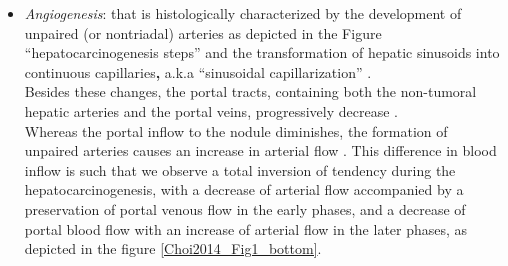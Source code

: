 \documentclass[]{article}
\begin{document}
\begin{itemize}
\item \emph{Angiogenesis}: that is histologically characterized by the
  development of unpaired (or nontriadal) arteries as depicted in the
  Figure ``hepatocarcinogenesis steps'' and the transformation of
  hepatic sinusoids into continuous capillaries\textbf{,} a.k.a
  ``sinusoidal capillarization'' \cite{Palmer2012,Coleman2005}.\\
  Besides these changes, the portal tracts, containing both the
  non-tumoral hepatic arteries and the portal veins, progressively
  decrease \cite{Kojiro2005}.\\
  Whereas the portal inflow to the nodule diminishes, the formation of
  unpaired arteries causes an increase in arterial flow \cite{Palmer2012, Coleman2005}. This difference in blood inflow is such that
  we observe a total inversion of tendency during the
  hepatocarcinogenesis, with a decrease of arterial flow accompanied by
  a preservation of portal venous flow in the early phases, and a
  decrease of portal blood flow with an increase of arterial flow in the
  later phases, as depicted in the figure \ref{Choi2014_Fig1_bottom}.\\
  

\end{itemize}
\end{document}

